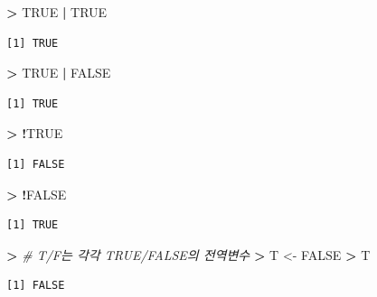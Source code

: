 \documentclass[11pt,a4paper]{book}
\newenvironment{Shaded}{\begin{snugshade}}{\end{snugshade}}
\newcommand{\StringTok}[1]{\textcolor[rgb]{0.31,0.60,0.02}{#1}}
\newcommand{\CommentTok}[1]{\textcolor[rgb]{0.56,0.35,0.01}{\textit{#1}}}
\newcommand{\OtherTok}[1]{\textcolor[rgb]{0.56,0.35,0.01}{#1}}
\newcommand{\OperatorTok}[1]{\textcolor[rgb]{0.81,0.36,0.00}{\textbf{#1}}}
\newcommand{\ErrorTok}[1]{\textcolor[rgb]{0.64,0.00,0.00}{\textbf{#1}}}
\newcommand{\NormalTok}[1]{#1}
\theoremstyle{definition}
\theoremstyle{definition}
\theoremstyle{definition}
\theoremstyle{remark}
\begin{document}
\begin{Shaded}
\begin{Highlighting}[]
\OperatorTok{>}\StringTok{ }\OtherTok{TRUE} \OperatorTok{|}\StringTok{ }\OtherTok{TRUE}
\end{Highlighting}
\end{Shaded}

\begin{verbatim}
[1] TRUE
\end{verbatim}

\begin{Shaded}
\begin{Highlighting}[]
\OperatorTok{>}\StringTok{ }\OtherTok{TRUE} \OperatorTok{|}\StringTok{ }\OtherTok{FALSE}
\end{Highlighting}
\end{Shaded}

\begin{verbatim}
[1] TRUE
\end{verbatim}

\begin{Shaded}
\begin{Highlighting}[]
\OperatorTok{>}\StringTok{ }\OperatorTok{!}\OtherTok{TRUE}
\end{Highlighting}
\end{Shaded}

\begin{verbatim}
[1] FALSE
\end{verbatim}

\begin{Shaded}
\begin{Highlighting}[]
\OperatorTok{>}\StringTok{ }\OperatorTok{!}\OtherTok{FALSE}
\end{Highlighting}
\end{Shaded}

\begin{verbatim}
[1] TRUE
\end{verbatim}

\begin{Shaded}
\begin{Highlighting}[]
\OperatorTok{>}\StringTok{ }\CommentTok{# T/F는 각각 TRUE/FALSE의 전역변수}
\ErrorTok{>}\StringTok{ }\NormalTok{T <-}\StringTok{ }\OtherTok{FALSE}
\OperatorTok{>}\StringTok{ }\NormalTok{T}
\end{Highlighting}
\end{Shaded}

\begin{verbatim}
[1] FALSE
\end{verbatim}
\end{document}
